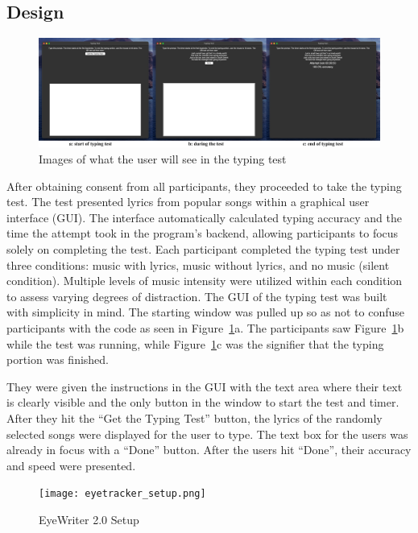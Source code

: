 \documentclass[manuscript, screen, review]{acmart} %
\begin{document}
\subsection[short]{Design}

\begin{figure}
  \includegraphics[width=\textwidth]{typingTest}
  \caption{Images of what the user will see in the typing test}
  \label{typingTest}
\end{figure}

After obtaining consent from all participants, they proceeded to take the typing test. The test presented lyrics from popular songs within a graphical user interface (GUI). 
The interface automatically calculated typing accuracy and the time the attempt took in the program's backend, allowing participants to focus solely on completing the test.
Each participant completed the typing test under three conditions: music with lyrics, music without lyrics, and no music (silent condition).
Multiple levels of music intensity were utilized within each condition to assess varying degrees of distraction.
The GUI of the typing test was built with simplicity in mind. The starting window was pulled up so as not to confuse participants with the code as seen in Figure~\ref*{typingTest}a. The participants saw Figure~\ref*{typingTest}b while the test was running, while Figure~\ref*{typingTest}c was the signifier that the typing portion was finished. 

They were given the instructions in the GUI with the text area where their text is clearly visible and the only button in the window to start the test and timer. 
After they hit the ``Get the Typing Test'' button, the lyrics of the randomly selected songs were displayed for the user to type. 
The text box for the users was already in focus with a ``Done'' button. After the users hit ``Done'', their accuracy and speed were presented.

\begin{figure}
  \center
  \texttt{[image: eyetracker\_setup.png]}
  \caption{EyeWriter 2.0 Setup}
  \label{EyeWriter}
\end{figure}
\end{document}
